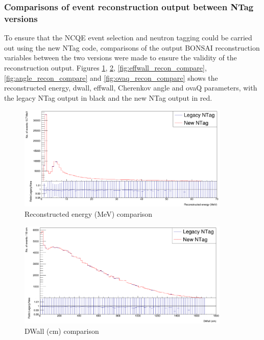 \subsubsection{Comparisons of event reconstruction output between NTag versions}
To ensure that the NCQE event selection and neutron tagging could be carried out using the new NTag code, comparisons of the output BONSAI reconstruction variables between the two versions were made to ensure the validity of the reconstruction output. Figures \ref{fig:energy_recon_compare}, \ref{fig:dwall_recon_compare}, \ref{fig:effwall_recon_compare}, \ref{fig:angle_recon_compare} and \ref{fig:ovaq_recon_compare}  shows the reconstructed energy, dwall, effwall, Cherenkov angle and ovaQ parameters, with the legacy NTag output in black and the new NTag output in red. 


\begin{figure}[htp]
        \centering
        \includegraphics[width=0.9\textwidth]{Figures/energy_recon_compare.PNG}
        \caption{Reconstructed energy (MeV) comparison}
        \label{fig:energy_recon_compare}    
\end{figure}

\begin{figure}
    \centering
    \includegraphics[width=0.9\textwidth]{Figures/dwall_recon_compare.PNG}
    \caption{DWall (cm) comparison}
    \label{fig:dwall_recon_compare}

\end{figure}

